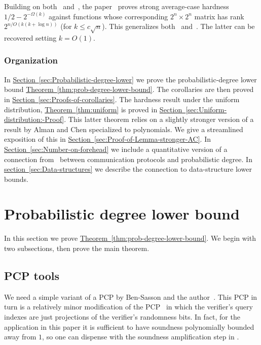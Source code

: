 \documentclass[11pt]{article}
\newcommand{\expref}[2]{\texorpdfstring{\hyperref[#2]{#1~\ref{#2}}}{#1~\ref{#2}}}
\begin{document}
Building on both~\cite{ChenLW2020-almost} and~\cite{DBLP:journals/corr/abs-2005-03123},
the paper~\cite{Huang-Viola-average-case-rigidity} proves strong
average-case hardness $1/2-2^{-\Omega(k)}$ against functions whose
corresponding $2^{n}\times2^{n}$ matrix has rank $2^{n/O(k(k+\log n))}$
(for $k\le c\sqrt{n}$). This generalizes both~\cite{ChenLW2020-almost}
and~\cite{DBLP:journals/corr/abs-2005-03123}. The latter can be recovered
setting $k=O(1)$.

\subsubsection{Organization}

In \expref{Section}{sec:Probabilistic-degree-lower} we prove the probabilistic-degree
lower bound \expref{Theorem}{thm:prob-degree-lower-bound}. The corollaries
are then proved in \expref{Section}{sec:Proofs-of-corollaries}. The hardness
result under the uniform distribution, \expref{Theorem}{thm:uniform}
is proved in \expref{Section}{sec:Uniform-distribution:-Proof}. This
latter theorem relies on a slightly stronger version of a result by
Alman and Chen specialized to polynomials. We give a streamlined exposition
of this in \expref{Section}{sec:Proof-of-Lemma-stronger-AC}. In \expref{Section}{sec:Number-on-forehead} we include a quantitative version of
a connection from~\cite{Viola-map} between communication protocols
and probabilistic degree. In \expref{section}{sec:Data-structures} we
describe the connection to data-structure lower bounds.


\section{Probabilistic degree lower bound \label{sec:Probabilistic-degree-lower}}

In this section we prove \expref{Theorem}{thm:prob-degree-lower-bound}.
We begin with two subsections, then prove the main theorem.

\subsection{PCP tools \label{subsec:PCP-tools}}

We need a simple variant of a PCP by Ben-Sasson and the author~\cite{Ben-SassonV-AC0PCP}.
This PCP in turn is a relatively minor modification of the PCP~\cite{Ben-SassonGHSV05}
in which the verifier's query indexes are just projections of the
verifier's randomness bits. In fact, for the application in this paper
it is sufficient to have soundness polynomially bounded away from
$1$, so one can dispense with the soundness amplification step in
\cite{Ben-SassonV-AC0PCP}.
\end{document}
